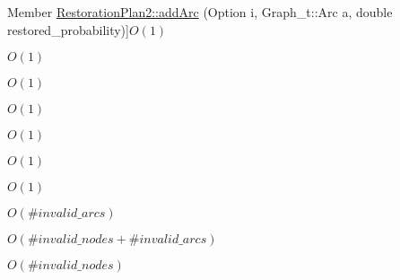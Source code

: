 \begin{DoxyRefList}
%
Member \hyperlink{class_restoration_plan2_a37dd2e978ecb5e36fa2c35e5025cf729}{Restoration\+Plan2\+:\+:add\+Arc} (Option i, Graph\+\_\+t\+::\+Arc a, double restored\+\_\+probability)]$O(1)$  
\item[\label{space__space000013}%
\Hypertarget{space__space000013}%
Member \hyperlink{class_restoration_plan2_a0a5a2740cdea0ec03ffa9c5d1d94a202}{Restoration\+Plan2\+:\+:add\+Node} (Option i, Graph\+\_\+t\+::\+Node v, double quality\+\_\+gain)]$O(1)$  
\item[\label{space__space000023}%
\Hypertarget{space__space000023}%
Member \hyperlink{class_restoration_plan2_a7461e5c0cd622f9e6adbf38f34753a07}{Restoration\+Plan2\+:\+:add\+Option} (double c)]$O(1)$  
\item[\label{space__space000009}%
\Hypertarget{space__space000009}%
Member \hyperlink{class_restoration_plan2_acf5e11d698c3306efeafaa5ca5d6f3ed}{Restoration\+Plan2\+:\+:contains} (Option i, Graph\+\_\+t\+::\+Node v) const]$O(1)$  
\item[\label{space__space000010}%
\Hypertarget{space__space000010}%
Member \hyperlink{class_restoration_plan2_a1884daec27de69af8302b961aee1b232}{Restoration\+Plan2\+:\+:contains} (Option i, Graph\+\_\+t\+::\+Arc a) const]$O(1)$  
\item[\label{space__space000011}%
\Hypertarget{space__space000011}%
Member \hyperlink{class_restoration_plan2_a753668d5ba34ea1e088aee85218543b7}{Restoration\+Plan2\+:\+:contains} (Graph\+\_\+t\+::\+Node v) const]$O(1)$  
\item[\label{space__space000012}%
\Hypertarget{space__space000012}%
Member \hyperlink{class_restoration_plan2_acac88b4dcb361cf6ca3061457ff05bfa}{Restoration\+Plan2\+:\+:contains} (Graph\+\_\+t\+::\+Arc a) const]$O(1)$  
\item[\label{space__space000031}%
\Hypertarget{space__space000031}%
Member \hyperlink{class_restoration_plan2_a51e5a2f223e0cbd8763f0ff60c8a4599}{Restoration\+Plan2\+:\+:erase\+Invalid\+Arcs} ()]$O(\#invalid\_arcs)$  
\item[\label{space__space000032}%
\Hypertarget{space__space000032}%
Member \hyperlink{class_restoration_plan2_aeb925e92d2141fe96979538f087c277a}{Restoration\+Plan2\+:\+:erase\+Invalid\+Elements} ()]$O(\#invalid\_nodes + \#invalid\_arcs)$  
\item[\label{space__space000030}%
\Hypertarget{space__space000030}%
Member \hyperlink{class_restoration_plan2_a5258c8409176279c8bab604400722b25}{Restoration\+Plan2\+:\+:erase\+Invalid\+Nodes} ()]$O(\#invalid\_nodes)$  

\end{DoxyRefList}
